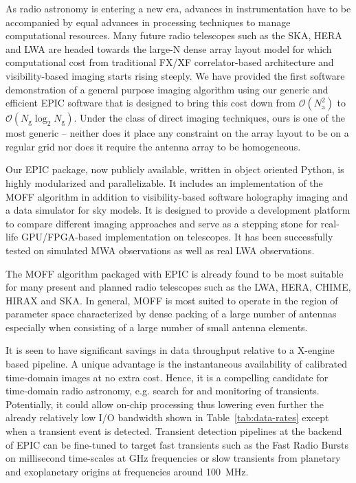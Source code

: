 \documentclass[a4paper,fleqn,usenatbib]{mnras}
\newcommand{\Nant}{N_\textrm{a}}
\newcommand{\Ngrid}{N_\textrm{g}}
\begin{document}
As radio astronomy is entering a new era, advances in instrumentation have to
be accompanied by equal advances in processing techniques to manage 
computational resources. Many future radio telescopes such as the SKA, HERA and 
LWA are headed towards the large-N dense array layout model for which 
computational cost from traditional FX/XF correlator-based architecture and 
visibility-based imaging starts rising steeply. We have provided the first 
software demonstration of a general purpose imaging algorithm using our generic 
and efficient EPIC software that is designed to bring this cost down from 
$\mathcal{O}(\Nant^2)$ to $\mathcal{O}(\Ngrid\log_2 \Ngrid)$. Under the class of 
direct imaging 
techniques, ours is one of the most generic -- neither does it place any 
constraint on the array layout to be on a regular grid nor does it require the
antenna array to be homogeneous. 

Our EPIC package, now publicly available, written in object oriented Python, is 
highly modularized and parallelizable. It includes an implementation of the 
MOFF algorithm in addition to visibility-based software holography imaging and 
a data simulator for sky models. It is designed to provide a development 
platform to compare different imaging approaches and serve as a stepping stone 
for real-life GPU/FPGA-based implementation on telescopes. It has been 
successfully tested on simulated MWA observations as well as real LWA 
observations. 

The MOFF algorithm packaged with EPIC is already found to be most suitable 
for many present and planned radio telescopes such as the LWA, HERA, CHIME,
HIRAX and SKA. In general, MOFF is most suited to operate in the region of 
parameter space characterized by dense packing of a large number of antennas 
especially when consisting of a large number of small antenna elements. 

It is seen to have significant savings in data throughput relative to a 
X-engine based pipeline. A unique advantage is the instantaneous availability 
of calibrated time-domain images at no extra cost. Hence, it is a compelling 
candidate for time-domain radio astronomy, e.g. search for and monitoring of 
transients. Potentially, it could allow on-chip processing thus lowering even 
further the already relatively low I/O bandwidth shown in 
Table~\ref{tab:data-rates} except when a transient event is detected. Transient 
detection pipelines at the backend of EPIC can be fine-tuned to target fast 
transients such as the Fast Radio Bursts \citep[FRB;][]{tho13} on millisecond 
time-scales at GHz frequencies or slow transients from planetary and exoplanetary 
origins at frequencies around 100~MHz. 
\end{document}

